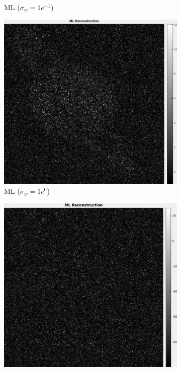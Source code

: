 \documentclass[a4paper, 11pt]{article}
\begin{document}
\begin{figure}[h]
\begin{subfigure}[b]{0.22\textwidth}
        \caption{ML ($\sigma_w=1e^{-1}$)}
        \label{fig:ML-1}
    \end{subfigure}
    \begin{subfigure}[b]{0.22\textwidth}
        \includegraphics[width=\textwidth]{../Figures/MLReconstructionNoiseSigma1e0.png}
        \caption{ML ($\sigma_w=1e^{0}$)}
        \label{fig:ML0}
    \end{subfigure}
    \begin{subfigure}[b]{0.22\textwidth}
        \includegraphics[width=\textwidth]{../Figures/MLReconstructionNoiseSigma1e1.png}

\end{subfigure}
\end{figure}
\end{document}
